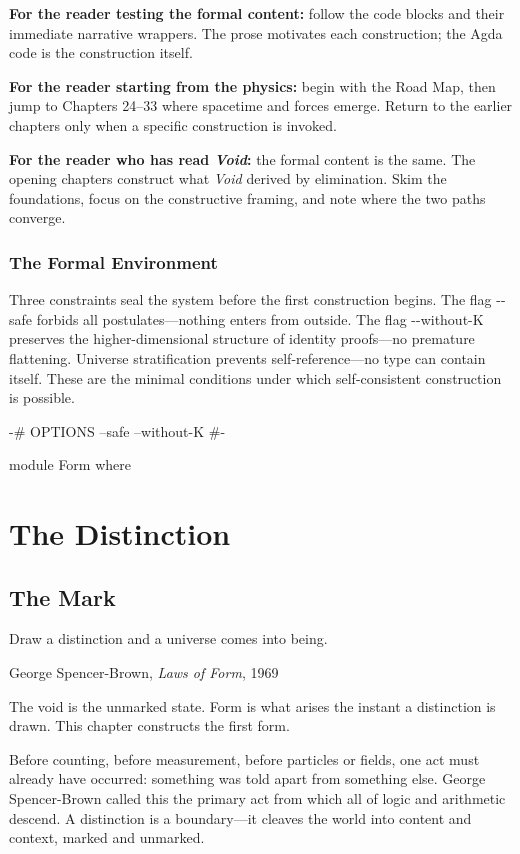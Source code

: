 \documentclass[11pt,a4paper]{book}
\newcommand{\AgdaFlag}[1]{\texttt{-{}-#1}}
\def\texttt#1{#1}%
\begin{document}
\textbf{For the reader testing the formal content:} follow the code blocks and their immediate narrative wrappers. The prose motivates each construction; the Agda code is the construction itself.

\textbf{For the reader starting from the physics:} begin with the Road Map, then jump to Chapters 24--33 where spacetime and forces emerge. Return to the earlier chapters only when a specific construction is invoked.

\textbf{For the reader who has read \textit{Void}:} the formal content is the same. The opening chapters construct what \textit{Void} derived by elimination. Skim the foundations, focus on the constructive framing, and note where the two paths converge.

\section*{The Formal Environment}

Three constraints seal the system before the first construction begins. The flag \AgdaFlag{safe} forbids all postulates---nothing enters from outside. The flag \AgdaFlag{without-K} preserves the higher-dimensional structure of identity proofs---no premature flattening. Universe stratification prevents self-reference---no type can contain itself. These are the minimal conditions under which self-consistent construction is possible.

\begin{code}
{-# OPTIONS --safe --without-K #-}

module Form where
\end{code}

\tableofcontents
\mainmatter

\part{The Distinction}

\chapter{The Mark}

\epigraph{Draw a distinction and a universe comes into being.}{George Spencer-Brown, \textit{Laws of Form}, 1969}

The void is the unmarked state. Form is what arises the instant a distinction is drawn. This chapter constructs the first form.

Before counting, before measurement, before particles or fields, one act must already have occurred: something was told apart from something else. George Spencer-Brown called this the primary act from which all of logic and arithmetic descend. A distinction is a boundary—it cleaves the world into content and context, marked and unmarked.
\end{document}
